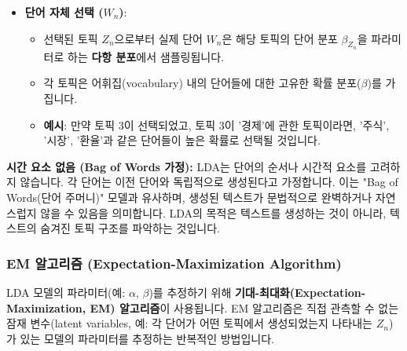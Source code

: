 \documentclass[11pt,a4paper]{article}
\begin{document}
\begin{enumerate}
\begin{itemize}
\begin{itemize}
        \end{itemize}
        \item \textbf{단어 자체 선택 ($W_n$)}:
        \begin{itemize}
            \item 선택된 토픽 $Z_n$으로부터 실제 단어 $W_n$은 해당 토픽의 단어 분포 $\beta_{Z_n}$을 파라미터로 하는 \textbf{다항 분포}에서 샘플링됩니다.
            \item 각 토픽은 어휘집(vocabulary) 내의 단어들에 대한 고유한 확률 분포($\beta$)를 가집니다.
            \item \textbf{예시}: 만약 토픽 3이 선택되었고, 토픽 3이 '경제'에 관한 토픽이라면, '주식', '시장', '환율'과 같은 단어들이 높은 확률로 선택될 것입니다.
        \end{itemize}
    \end{itemize}
\end{enumerate}

\begin{warningbox}
\textbf{시간 요소 없음 (Bag of Words 가정):}
LDA는 단어의 순서나 시간적 요소를 고려하지 않습니다. 각 단어는 이전 단어와 독립적으로 생성된다고 가정합니다. 이는 "Bag of Words(단어 주머니)" 모델과 유사하며, 생성된 텍스트가 문법적으로 완벽하거나 자연스럽지 않을 수 있음을 의미합니다. LDA의 목적은 텍스트를 생성하는 것이 아니라, 텍스트의 숨겨진 토픽 구조를 파악하는 것입니다.
\end{warningbox}

\subsubsection*{EM 알고리즘 (Expectation-Maximization Algorithm)}
\begin{conceptbox}
LDA 모델의 파라미터(예: $\alpha$, $\beta$)를 추정하기 위해 \textbf{기대-최대화(Expectation-Maximization, EM) 알고리즘}이 사용됩니다.
EM 알고리즘은 직접 관측할 수 없는 잠재 변수(latent variables, 예: 각 단어가 어떤 토픽에서 생성되었는지 나타내는 $Z_n$)가 있는 모델의 파라미터를 추정하는 반복적인 방법입니다.
\end{conceptbox}
\end{document}
